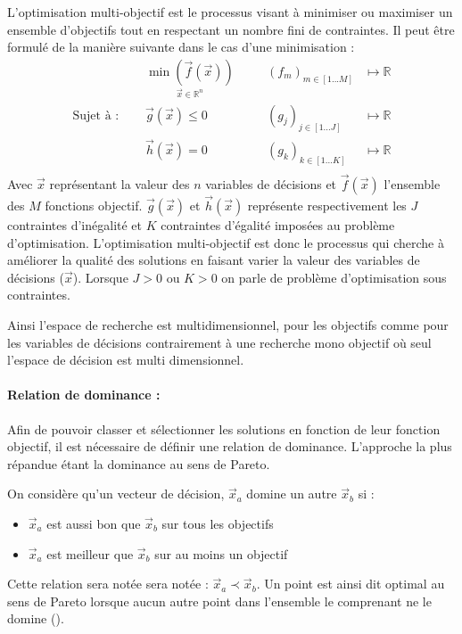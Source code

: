 \begin{Def}\label{def:optimisation_multi_objectif}
L’optimisation multi-objectif est le processus visant à minimiser ou maximiser un ensemble
d’objectifs tout en respectant un nombre fini de contraintes.
Il peut être formulé de la manière suivante dans le cas d’une minimisation :
\begin{equation}\label{eq:def_optimisation}
  \begin{aligned}
                           & \underset{\vec{x} \in \mathbb{R}^{n}}{\min(\vec{f}(\vec{x}))}& & \quad (f_{m})_{m \in [1 ... M]} & \longmapsto \mathbb{R} \\
    \text{Sujet à : }\quad & \vec{g}(\vec{x}) \leqslant 0                                 & & \quad (g_{j})_{j \in [1 ... J]} & \longmapsto \mathbb{R} \\
                           & \vec{h}(\vec{x}) = 0                                         & & \quad (g_{k})_{k \in [1 ... K]} & \longmapsto \mathbb{R} \\
  \end{aligned}
\end{equation}
Avec $\vec{x}$ représentant la valeur des $n$ variables de décisions et $\vec{f}(\vec{x})$
l’ensemble des $M$ fonctions objectif.  $\vec{g}(\vec{x})$ et $\vec{h}(\vec{x})$ représente
respectivement les $J$ contraintes d’inégalité et $K$ contraintes d’égalité imposées au problème
d’optimisation. L’optimisation multi-objectif est donc le processus qui cherche à améliorer la
qualité des solutions en faisant varier la valeur des variables de décisions ($\vec{x}$).
Lorsque $J > 0$ ou $K > 0$ on parle de problème d’optimisation sous contraintes.
\end{Def}
Ainsi l’espace de recherche est multidimensionnel, pour les objectifs comme pour
les variables de décisions contrairement à une recherche mono objectif où seul
l’espace de décision est multi dimensionnel.

\paragraph{Relation de dominance :} %
\label{par:relation_de_dominance}
Afin de pouvoir classer et sélectionner les solutions en fonction de leur fonction
objectif, il est nécessaire de définir une relation de dominance.
L’approche la plus répandue étant la dominance au sens de Pareto.

\begin{Def}\label{def:dominance_de_pareto}
On considère qu’un vecteur de décision, $\vec{x}_{a}$ domine un autre $\vec{x}_{b}$ si :
\begin{itemize}
  \item $\vec{x}_{a}$ est aussi bon que $\vec{x}_{b}$ sur tous les objectifs
  \item $\vec{x}_{a}$ est meilleur que $\vec{x}_{b}$ sur au moins un objectif
\end{itemize}
Cette relation sera notée sera notée : $\vec{x}_{a} \prec \vec{x}_{b}$.
Un point est ainsi dit optimal au sens de Pareto lorsque aucun autre point dans
l’ensemble le comprenant ne le domine ().
\end{Def} 


